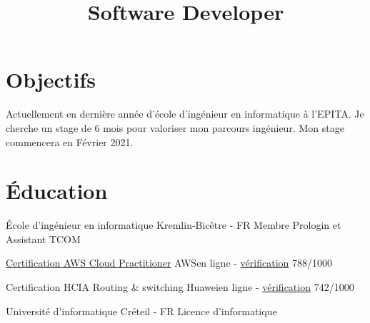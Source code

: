 \documentclass[10pt,a4paper,sans]{moderncv}
\title{Software Developer}
\newcommand\en[1]{}
\newcommand\fr[1]{#1}
\newcommand\full[1]{}
\begin{document}
\makecvtitle
\vspace*{-10mm}

\section{\fr{Objectifs}\en{Objectives}}
\fr{
    Actuellement en dernière année d'école d'ingénieur en informatique à
    l'EPITA.
    Je cherche un stage de 6 mois pour valoriser mon parcours ingénieur. Mon
    stage commencera en Février 2021.
    \full{
        Je cherche à appliquer mes compétences analytiques aux défis proposés
        par un stage dans votre entreprise.
        Mes capacités en Algorithmique et en recherche permettront à votre
        organisation d'atteindre ses objectifs.
    }
}
\en{
    Seeking to apply my analytical skills to the challenges posed by an
    internship at your company. Poses proven algorithmic and research abilities
    that will aid your company in meeting its milestones.
}

\section{\fr{\'Education}\en{Education}}
{\fr{\'Ecole d'ingénieur en informatique}\en{Computer Engineering}}
{Kremlin-Bicêtre - FR}
{\fr{Membre Prologin et Assistant TCOM}\en{Member of the Prologin Association and TCOM assistant}}{}

\cventry{\fr{Jan}\en{Jun} 2021}
{\href{https://aws.amazon.com/fr/certification/certified-cloud-practitioner/}{Certification AWS Cloud Practitioner}}
{AWS}{\fr{en ligne}\en{online} - \href{https://www.youracclaim.com/badges/4ab6148a-29a4-4b70-82c2-60c8b5c0c473}{v\fr{\'}erification}}
{788/1000}
{}

\cventry{D\fr{\'}ec 2020}
{Certification HCIA Routing \& switching}
{Huawei}{\fr{en ligne}\en{online} - \href{https://e.huawei.com/en/talent/\#/cert/certificate-verification}{v\fr{\'}erification}}
{742/1000}
{}

\full{\cventry{2020}{Huawei}
{\fr{Formation des les équipements et sur eNSP}\en{Training about equipments and eNSP}}
{Visio conference}
{}{}}

{\fr{Université d'informatique}\en{Computer Engineering focused School}}
{Créteil - FR}
{\fr{Licence d'informatique}}{}

\full{\cventry{2018}{Google}{Q{\&}A Meeting with an Google Software Engineer.}
{FR}{}{}}
\end{document}
